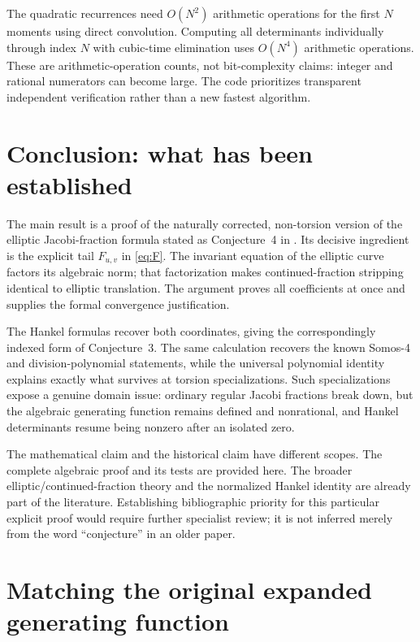 \documentclass[11pt,letterpaper]{article}
\numberwithin{equation}{section}
\theoremstyle{definition}
\theoremstyle{remark}
\begin{document}
The quadratic recurrences need $O(N^2)$ arithmetic operations for the first
$N$ moments using direct convolution. Computing all determinants individually
through index $N$ with cubic-time elimination uses $O(N^4)$ arithmetic
operations. These are arithmetic-operation counts, not bit-complexity
claims: integer and rational numerators can become large. The code prioritizes
transparent independent verification rather than a new fastest algorithm.

\section{Conclusion: what has been established}\label{sec:conclusion}

The main result is a proof of the naturally corrected, non-torsion version
of the elliptic Jacobi-fraction formula stated as Conjecture~4 in
\cite{Barry2023}. Its decisive ingredient is the explicit tail
$F_{u,v}$ in \eqref{eq:F}. The invariant equation of the elliptic curve
factors its algebraic norm; that factorization makes continued-fraction
stripping identical to elliptic translation. The argument proves all
coefficients at once and supplies the formal convergence justification.

The Hankel formulas recover both coordinates, giving the correspondingly
indexed form of Conjecture~3. The same calculation recovers the known
Somos-4 and division-polynomial statements, while the universal polynomial
identity explains exactly what survives at torsion specializations. Such
specializations expose a genuine domain issue: ordinary regular Jacobi
fractions break down, but the algebraic generating function remains defined
and nonrational, and Hankel determinants resume being nonzero after an
isolated zero.

The mathematical claim and the historical claim have different scopes.
The complete algebraic proof and its tests are provided here. The broader
elliptic/continued-fraction theory and the normalized Hankel identity are
already part of the literature. Establishing bibliographic priority for
this particular explicit proof would require further specialist review;
it is not inferred merely from the word ``conjecture'' in an older paper.

\appendix
\section{Matching the original expanded generating function}\label{app:normalization}
\end{document}
